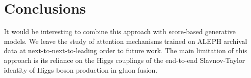 \section{Conclusions}\label{sec:conclusions}

It would be interesting to combine this approach with score-based
generative models. We leave the study of attention mechanisms trained on
ALEPH archival data at next-to-next-to-leading order to future work. The
main limitation of this approach is its reliance on the Higgs couplings
of the end-to-end Slavnov-Taylor identity of Higgs boson production in
gluon fusion.

